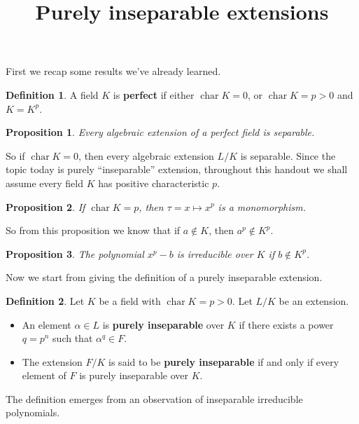 \documentclass[a4paper]{article}
\title{Purely inseparable extensions}
\date{}
\DeclareMathOperator{\Char}{char}
\theoremstyle{remark}
\theoremstyle{definition}
\theoremstyle{definition}
\newtheorem{definition}{Definition}
\theoremstyle{plain}
\newtheorem{proposition}{Proposition}
\begin{document}
  \maketitle
  \vspace*{-2.5cm}

  First we recap some results we've already learned.
  \begin{definition}
    A field $K$ is {\bf perfect} if either $\Char K = 0$, or $\Char K = p > 0$ and $K = K^p$.
  \end{definition}

  \begin{proposition}
    Every algebraic extension of a perfect field is separable.
  \end{proposition}

  So if $\Char K = 0$, then every algebraic extension $L/K$ is separable.
  Since the topic today is purely ``inseparable'' extension, throughout this handout
  we shall assume every field $K$ has positive characteristic $p$.

  \begin{proposition} \label{prop:p-power-is-mono}
    If $\Char K = p$, then $\tau = x \mapsto x^p$ is a monomorphism.
  \end{proposition}

  So from this proposition we know that if $a \not\in K$, then $a^p \not\in K^p$.

  \begin{proposition}
    The polynomial $x^p - b$ is irreducible over $K$ if $b \not\in K^p$.
  \end{proposition}


  Now we start from giving the definition of a purely inseparable extension.

  \begin{definition}
    Let $K$ be a field with $\Char K = p > 0$. Let $L/K$ be an extension.

    \begin{itemize}
      \item An element $\alpha \in L$ is {\bf purely inseparable} over $K$ if
        there exists a power $q = p^n$ such that $\alpha^q \in F$.
      \item The extension $F/K$ is said to be {\bf purely inseparable} if and only if
        every element of $F$ is purely inseparable over $K$.
    \end{itemize}
  \end{definition}

  The definition emerges from an observation of inseparable irreducible polynomials.
\end{document}
